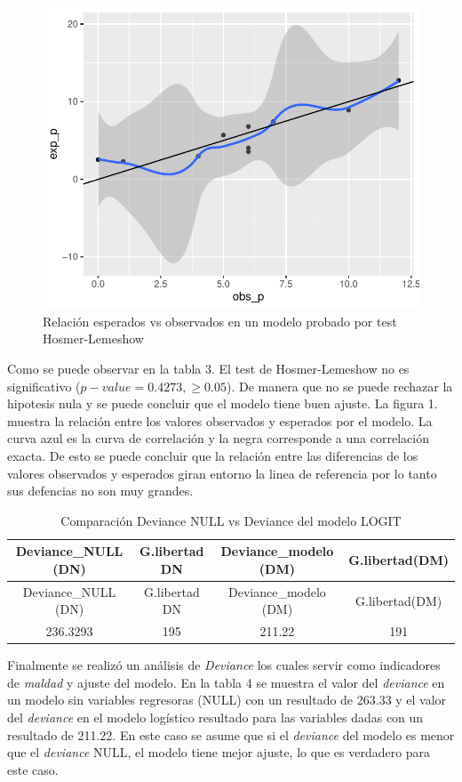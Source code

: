 \documentclass[
]{article}
\begin{document}
\begin{figure}
\centering
\includegraphics{taller4_regresionlogist_files/figure-latex/gráfica de relación de esperados y observados Hosmer-lemeshow-1.pdf}
\caption{Relación esperados vs observados en un modelo probado por test
Hosmer-Lemeshow}
\end{figure}

Como se puede observar en la tabla 3. El test de Hosmer-Lemeshow no es
significativo (\(p - value = 0.4273, \geq 0.05\)). De manera que no se
puede rechazar la hipotesis nula y se puede concluir que el modelo tiene
buen ajuste. La figura 1. muestra la relación entre los valores
observados y esperados por el modelo. La curva azul es la curva de
correlación y la negra corresponde a una correlación exacta. De esto se
puede concluir que la relación entre las diferencias de los valores
observados y esperados giran entorno la linea de referencia por lo tanto
sus defencias no son muy grandes.

\begin{longtable}[]{@{}cccc@{}}
\caption{Comparación Deviance NULL vs Deviance del modelo
LOGIT}\tabularnewline
\toprule
Deviance\_NULL (DN) & G.libertad DN & Deviance\_modelo (DM) &
G.libertad(DM)\tabularnewline
\midrule
\endfirsthead
\toprule
Deviance\_NULL (DN) & G.libertad DN & Deviance\_modelo (DM) &
G.libertad(DM)\tabularnewline
\midrule
\endhead
236.3293 & 195 & 211.22 & 191\tabularnewline
\bottomrule
\end{longtable}

Finalmente se realizó un análisis de \emph{Deviance} los cuales servir
como indicadores de \emph{maldad} y ajuste del modelo. En la tabla 4 se
muestra el valor del \emph{deviance} en un modelo sin variables
regresoras (NULL) con un resultado de 263.33 y el valor del
\emph{deviance} en el modelo logístico resultado para las variables
dadas con un resultado de 211.22. En este caso se asume que si el
\emph{deviance} del modelo es menor que el \emph{deviance} NULL, el
modelo tiene mejor ajuste, lo que es verdadero para este caso.
\end{document}
